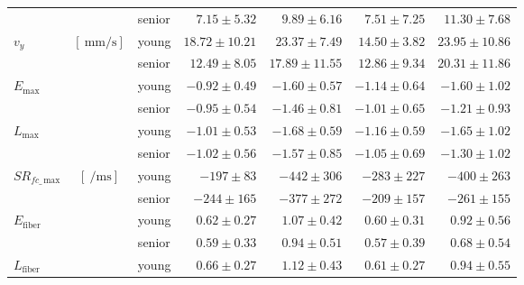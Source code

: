 \begin{table}[!htb]
\begin{center}
\begin{threeparttable}
\begin{tabular}{@{}lclrrrr@{}}
															&                   							     				& senior    & $7.15 \pm 5.32$   & $9.89 \pm 6.16$  &  $7.51 \pm 7.25$  & $11.30 \pm 7.68$  \\[4pt]
\multirow{2}{*}{$v_y$}\tnote{$1$, $4$}						& \multirow{2}{*}{$\left[\SI{}{\milli\meter/\second}\right]$} 	& young     & $18.72 \pm 10.21$ & $23.37 \pm 7.49$ &  $14.50 \pm 3.82$ & $23.95 \pm 10.86$ \\
                  											&                   							     				& senior    & $12.49 \pm 8.05$  & $17.89 \pm 11.55$&  $12.86 \pm 9.34$ & $20.31 \pm 11.86$ \\[4pt]
\multirow{2}{*}{$E_{\mathrm{max}}$}\tnote{$1$}				&                   							     				& young     & $-0.92 \pm 0.49$   & $-1.60 \pm 0.57$  &  $-1.14 \pm 0.64$  & $-1.60 \pm 1.02$   \\
 				                    							&                   							     				& senior    & $-0.95 \pm 0.54$   & $-1.46 \pm 0.81$  &  $-1.01 \pm 0.65$  & $-1.21 \pm 0.93$   \\[4pt]
\multirow{2}{*}{$L_{\mathrm{max}}$}\tnote{$1$}				&                   							     				& young     & $-1.01 \pm 0.53$   & $-1.68 \pm 0.59$  &  $-1.16 \pm 0.59$  & $-1.65 \pm 1.02$   \\
                  											&                   							     				& senior    & $-1.02 \pm 0.56$   & $-1.57 \pm 0.85$  &  $-1.05 \pm 0.69$  & $-1.30 \pm 1.02$   \\[4pt]
\multirow{2}{*}{$SR_{fc\_\,\mathrm{max}}$}\tnote{$2$, $3$}	& \multirow{2}{*}{$\left[\SI{}{\per\milli\second}\right]$} 		& young     & $-197 \pm 83$   	& $-442 \pm 306$    &  $-283 \pm 227$    & $-400 \pm 263$     \\
                  											&                   							     				& senior    & $-244 \pm 165$  	& $-377 \pm 272$    &  $-209 \pm 157$    & $-261 \pm 155$     \\[4pt]
\multirow{2}{*}{$E_{\mathrm{fiber}}$}\tnote{$2$}	        		&                   							     				& young     & $0.62 \pm 0.27$   & $1.07 \pm 0.42$  &  $0.60 \pm 0.31$  & $0.92 \pm 0.56$   \\
                  											&                   							     				& senior    & $0.59 \pm 0.33$   & $0.94 \pm 0.51$  &  $0.57 \pm 0.39$  & $0.68 \pm 0.54$   \\[4pt]
\multirow{2}{*}{$L_{\mathrm{fiber}}$}\tnote{$2$}	        		&                   							     				& young     & $0.66 \pm 0.27$   & $1.12 \pm 0.43$  &  $0.61 \pm 0.27$  & $0.94 \pm 0.55$   \\

\end{tabular}
\end{threeparttable}
\end{center}
\end{table}
